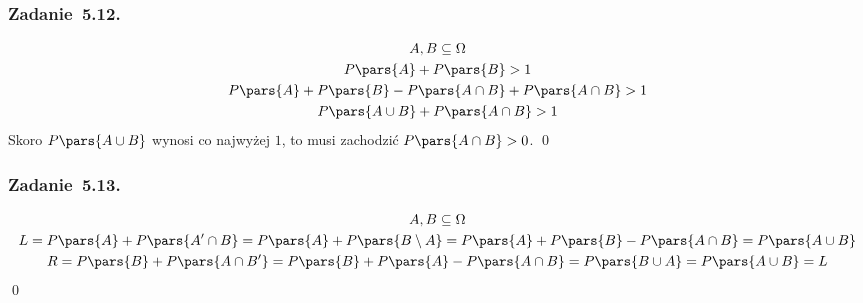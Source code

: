 \subsubsection*{Zadanie~5.12.}
\begin{gather*}
    A, B \subseteq \Omega\\
    P\pars{A} + P\pars{B} > 1\\
    P\pars{A} + P\pars{B} - P\pars{A \cap B} + P\pars{A \cap B} > 1\\
    P\pars{A \cup B} + P\pars{A \cap B} > 1
\end{gather*}
Skoro \(P\pars{A \cup B}\) wynosi co najwyżej \(1\), to musi zachodzić \(P\pars{A \cap B} > 0\).
\qed
\subsubsection*{Zadanie~5.13.}
\begin{gather*}
    A, B \subseteq \Omega\\
    L = P\pars{A} + P\pars{A' \cap B}
        = P\pars{A} + P\pars{B \setminus A}
        = P\pars{A} + P\pars{B} - P\pars{A \cap B}
        = P\pars{A \cup B}\\
    R = P\pars{B} + P\pars{A \cap B'}
        = P\pars{B} + P\pars{A} - P\pars{A \cap B}
        = P\pars{B \cup A}
        = P\pars{A \cup B} = L
\end{gather*}
\qed